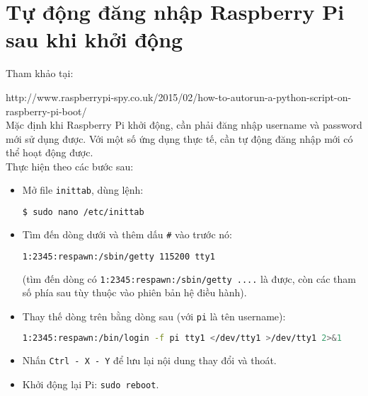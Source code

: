 \chapter{Tự động đăng nhập Raspberry Pi sau khi khởi động}
\label{Sub:auto-login}
Tham khảo tại:

\textsf{http://www.raspberrypi-spy.co.uk/2015/02/how-to-autorun-a-python-script-on-raspberry-pi-boot/}\\

Mặc định khi Raspberry Pi khởi động, cần phải đăng nhập username và password mới sử dụng được. Với một số ứng dụng thực tế, cần tự động đăng nhập mới có thể hoạt động được.\\

Thực hiện theo các bước sau:
\begin{itemize}
\item Mở file \verb|inittab|, dùng lệnh:
\begin{lstlisting}[language=bash]
$ sudo nano /etc/inittab
\end{lstlisting}
\item Tìm đến dòng dưới và thêm dấu \verb|#| vào trước nó:
\begin{lstlisting}[language=bash]
1:2345:respawn:/sbin/getty 115200 tty1
\end{lstlisting}
(tìm đến dòng có \verb|1:2345:respawn:/sbin/getty ....| là được, còn các tham số phía sau tùy thuộc vào phiên bản hệ điều hành).
\item Thay thế dòng trên bằng dòng sau (với \verb|pi| là tên username):
\begin{lstlisting}[language=bash]
1:2345:respawn:/bin/login -f pi tty1 </dev/tty1 >/dev/tty1 2>&1
\end{lstlisting}
\item Nhấn \verb|Ctrl - X - Y| để lưu lại nội dung thay đổi và thoát.
\item Khởi động lại Pi: \verb|sudo reboot|.
\end{itemize}